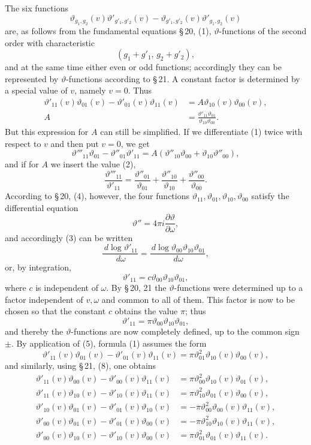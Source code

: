 \documentclass[11pt]{article}
\newcommand{\dd}{\,d}
\newcommand{\tht}{\vartheta}
\begin{document}
The six functions
\[
\tht_{g_1,g_2}(v)\tht'_{g'_1,g'_2}(v)-\tht_{g'_1,g'_2}(v)\tht'_{g_1,g_2}(v)
\]
are, as follows from the fundamental equations \S\,20, (1), $\vartheta$-functions of the second order with characteristic
\[
(g_1+g'_1,\,g_2+g'_2),
\]
and at the same time either even or odd functions; accordingly they can be represented by $\vartheta$-functions according to \S\,21. A constant factor is determined by a special value of $v$, namely $v=0$. Thus
\begin{align}
\tht'_{11}(v)\tht_{01}(v)-\tht'_{01}(v)\tht_{11}(v)&=A\tht_{10}(v)\tht_{00}(v), \tag{1}\\
A&=\frac{\tht'_{11}\tht_{01}}{\tht_{10}\tht_{00}}. \tag{2}
\end{align}
But this expression for $A$ can still be simplified. If we differentiate (1) twice with respect to $v$ and then put $v=0$, we get
\[
\tht'''_{11}\tht_{01}-\tht''_{01}\tht'_{11}=A(\tht''_{10}\tht_{00}+\tht_{10}\tht''_{00}),
\]
and if for $A$ we insert the value (2),
\begin{equation}
\frac{\tht'''_{11}}{\tht'_{11}}=\frac{\tht''_{01}}{\tht_{01}}+
\frac{\tht''_{10}}{\tht_{10}}+\frac{\tht''_{00}}{\tht_{00}}.
\tag{3}
\end{equation}
According to \S\,20, (4), however, the four functions $\tht_{11},\tht_{01},\tht_{10},\tht_{00}$ satisfy the differential equation
\begin{equation}
\tht''=4\pi i\frac{\partial \tht}{\partial \omega},
\tag{4}
\end{equation}
and accordingly (3) can be written
\[
\frac{\dd\log\tht'_{11}}{\dd\omega}=\frac{\dd\log\tht_{00}\tht_{10}\tht_{01}}{\dd\omega},
\]
or, by integration,
\[
\tht'_{11}=c\tht_{00}\tht_{10}\tht_{01},
\]
where $c$ is independent of $\omega$. By \S\,20, 21 the $\vartheta$-functions were determined up to a factor independent of $v,\omega$ and common to all of them. This factor is now to be chosen so that the constant $c$ obtains the value $\pi$; thus
\begin{equation}
\tht'_{11}=\pi\tht_{00}\tht_{10}\tht_{01},
\tag{5}
\end{equation}
and thereby the $\vartheta$-functions are now completely defined, up to the common sign $\pm$. By application of (5), formula (1) assumes the form
\begin{equation}
\tht'_{11}(v)\tht_{01}(v)-\tht'_{01}(v)\tht_{11}(v)=\pi\tht_{01}^{2}\tht_{10}(v)\tht_{00}(v),
\tag{6}
\end{equation}
and similarly, using \S\,21, (8), one obtains
\begin{align}
\tht'_{11}(v)\tht_{00}(v)-\tht'_{00}(v)\tht_{11}(v)&=\pi\tht_{00}^{2}\tht_{10}(v)\tht_{01}(v), \tag{7}\\
\tht'_{11}(v)\tht_{10}(v)-\tht'_{10}(v)\tht_{11}(v)&=\pi\tht_{10}^{2}\tht_{01}(v)\tht_{00}(v), \tag{8}\\
\tht'_{10}(v)\tht_{01}(v)-\tht'_{01}(v)\tht_{10}(v)&=-\pi\tht_{00}^{2}\tht_{00}(v)\tht_{11}(v), \tag{9}\\
\tht'_{00}(v)\tht_{01}(v)-\tht'_{01}(v)\tht_{00}(v)&=-\pi\tht_{10}^{2}\tht_{10}(v)\tht_{11}(v), \tag{10}\\
\tht'_{00}(v)\tht_{10}(v)-\tht'_{10}(v)\tht_{00}(v)&=\pi\tht_{01}^{2}\tht_{01}(v)\tht_{11}(v). \tag{11}
\end{align}
\end{document}
